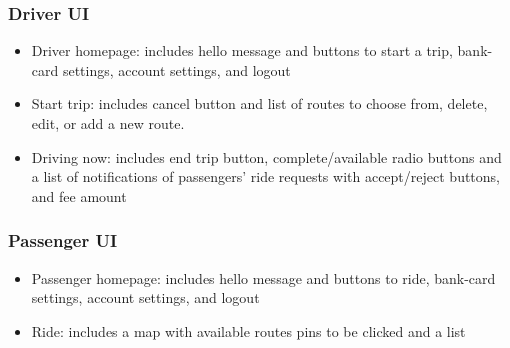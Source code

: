 \documentclass{BusMateSRS}
\begin{document}
\subsubsection{Driver UI}
\begin{itemize}
	\item Driver homepage:
	      includes hello message and buttons to start a trip, bank-card settings,
	      account settings, and logout
	\item Start trip:
	      includes cancel button and list of routes to choose from, delete, edit,
	      or add a new route.
	\item Driving now:
	      includes end trip button, complete/available radio buttons and
	      a list of notifications of passengers'
	      ride requests with accept/reject buttons, and fee amount
\end{itemize}

\subsubsection{Passenger UI}
\begin{itemize}
	\item Passenger homepage:
	      includes hello message and buttons to ride, bank-card settings,
	      account settings, and logout
	\item Ride:
	      includes a map with available routes pins to be clicked and a list
\end{itemize}
\end{document}
